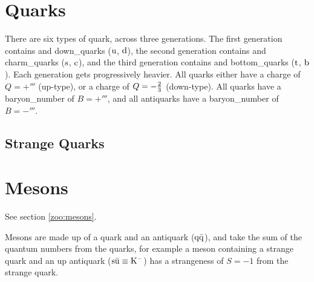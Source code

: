     \section{Quarks}
        There are six types of \gls{quark}, across three generations.
        The first generation contains  and \glspl{down_quark} ($\mathrm{u}$, $\mathrm{d}$), the second generation contains  and \glspl{charm_quark} ($\mathrm{s}$, $\mathrm{c}$), and the third generation contains  and \glspl{bottom_quark} ($\mathrm{t}$, $\mathrm{b}$).
        Each generation gets progressively heavier.
        All \glspl{quark} either have a charge of $Q=+\third$ (up-type), or a charge of $Q=-\frac{2}{3}$ (down-type).
        All \glspl{quark} have a \gls{baryon_number} of $B=+\third$, and all \glspl{antiquark} have a \gls{baryon_number} of $B=-\third$.

        \subsection{Strange Quarks}

    \section{Mesons}
        See section \ref{zoo:mesons}.

        Mesons are made up of a quark and an antiquark ($\mesonquarks[q][q]$), and take the sum of the quantum numbers from the quarks, for example a meson containing a strange quark and an up antiquark ($\mesonquarks[s][u]\equiv\kaon[-]$) has a strangeness of $S=-1$ from the strange quark.
        
